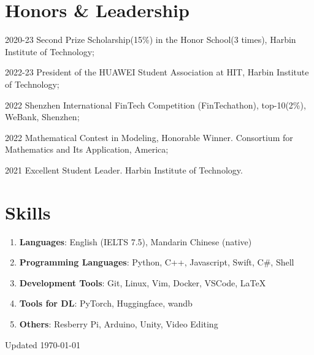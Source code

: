 \documentclass[11pt,letterpaper]{report}
\begin{document}
\section*{Honors \& Leadership}

\begin{tablist}

\item[2020-23] \tab{} Second Prize Scholarship(15\%) in the Honor School(3 times), Harbin Institute of Technology;
\item[2022-23] \tab{} President of the HUAWEI Student Association at HIT, Harbin Institute of Technology;
\item[2022] \tab{} Shenzhen International FinTech Competition (FinTechathon), top-10(2\%), WeBank, Shenzhen;
\item[2022] \tab{} Mathematical Contest in Modeling, Honorable Winner. Consortium for Mathematics and Its Application, America;
\item[2021] \tab{} Excellent Student Leader. Harbin Institute of Technology.

\end{tablist}

\section*{Skills}

\begin{enumerate}[label=\textbullet]
    \item \textbf{Languages}: English (IELTS 7.5), Mandarin Chinese (native)
    \item \textbf{Programming Languages}: Python, C++, Javascript, Swift, C\#, Shell
    \item \textbf{Development Tools}: Git, Linux, Vim, Docker, VSCode, \LaTeX
    \item \textbf{Tools for DL}: PyTorch, Huggingface, wandb
    \item \textbf{Others}: Resberry Pi, Arduino, Unity, Video Editing
  \end{enumerate}

\begin{center}
    \vfill
    Updated \monthyeardate\today
\end{center}
\end{document}
